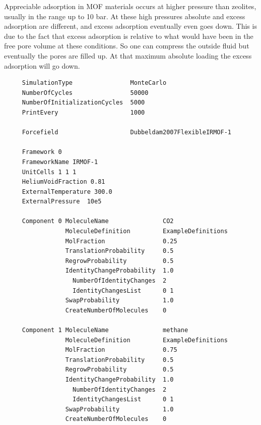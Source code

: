 Appreciable adsorption in MOF materials occurs at higher pressure than zeolites, usually in the range up to 10 bar. At these high pressures
absolute and excess adsorption are different, and excess adsorption eventually even goes down. This is due to the fact that excess adsorption is relative
to what would have been in the free pore volume at these conditions. So one can compress the outside fluid but eventually the pores are filled up. At that
maximum absolute loading the excess adsorption will go down.
\begin{tiny}
\begin{verbatim}
     SimulationType                MonteCarlo
     NumberOfCycles                50000
     NumberOfInitializationCycles  5000
     PrintEvery                    1000
     
     Forcefield                    Dubbeldam2007FlexibleIRMOF-1
     
     Framework 0
     FrameworkName IRMOF-1
     UnitCells 1 1 1
     HeliumVoidFraction 0.81
     ExternalTemperature 300.0
     ExternalPressure  10e5
     
     Component 0 MoleculeName               CO2
                 MoleculeDefinition         ExampleDefinitions
                 MolFraction                0.25
                 TranslationProbability     0.5
                 RegrowProbability          0.5
                 IdentityChangeProbability  1.0
                   NumberOfIdentityChanges  2
                   IdentityChangesList      0 1
                 SwapProbability            1.0
                 CreateNumberOfMolecules    0
     
     Component 1 MoleculeName               methane
                 MoleculeDefinition         ExampleDefinitions
                 MolFraction                0.75
                 TranslationProbability     0.5
                 RegrowProbability          0.5
                 IdentityChangeProbability  1.0
                   NumberOfIdentityChanges  2
                   IdentityChangesList      0 1
                 SwapProbability            1.0
                 CreateNumberOfMolecules    0
\end{verbatim}
\end{tiny}

